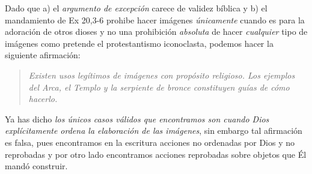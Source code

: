 \documentclass{article}
\begin{document}
Dado que a) el \emph{argumento de excepci\'on} carece de validez b\'{i}blica y b) el mandamiento de Ex 20,3-6 prohibe hacer im\'agenes \emph{\'unicamente} cuando es para la adoraci\'on de otros dioses y no una prohibici\'on \emph{absoluta} de hacer \emph{cualquier} tipo de im\'agenes como pretende el protestantismo iconoclasta, podemos hacer la siguiente afirmaci\'on:

\begin{quote}
\emph{Existen usos leg\'itimos de im\'agenes con prop\'osito religioso. Los ejemplos del Arca, el Templo y la serpiente de bronce constituyen gu\'{i}as de c\'omo hacerlo.}
\end{quote}

\noindent
Ya has dicho \emph{los \'unicos casos v\'alidos que encontramos son cuando Dios expl\'{i}citamente ordena la elaboraci\'on de las im\'agenes}, sin embargo tal afirmaci\'on es falsa, pues encontramos en la escritura acciones no ordenadas por Dios y no reprobadas y por otro lado encontramos acciones reprobadas sobre objetos que \'El mand\'o construir.
\end{document}
